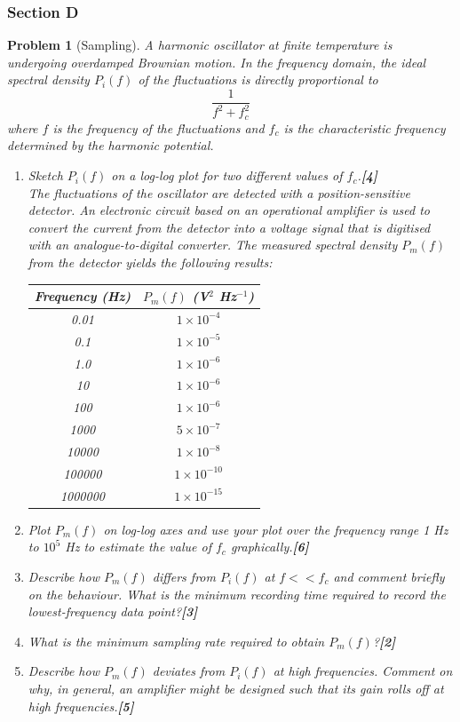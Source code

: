 \documentclass[a4paper]{article}
\theoremstyle{new}
\newtheorem{qns}{Problem}[subsection]
\begin{document}
\subsubsection{Section D}
\begin{qns}[Sampling]
A harmonic oscillator at finite temperature is undergoing overdamped Brownian motion. In the frequency domain, the ideal spectral density $P_i(f)$ of the fluctuations is directly proportional to
$$\frac{1}{f^2+f_c^2}$$
where $f$ is the frequency of the fluctuations and $f_c$ is the characteristic frequency determined by the harmonic potential.
\begin{enumerate}[label=(\roman*)]
\item Sketch $P_i(f)$ on a log-log plot for two different values of $f_c$.\hfill\textbf{[4]}\\[5pt]
The fluctuations of the oscillator are detected with a position-sensitive detector. An electronic circuit based on an operational amplifier is used to convert the current from the detector into a voltage signal that is digitised with an analogue-to-digital converter. The measured spectral density $P_m(f)$ from the detector yields the following results:
\begin{center}
\begin{tabular}{|c|c|}
\hline
Frequency (Hz) & $P_m(f)$ (V$^2$ Hz$^{-1}$)\\
\hline
0.01 & $1\times10^{-4}$\\
0.1 & $1\times10^{-5}$\\
1.0 & $1\times10^{-6}$\\
10 & $1\times10^{-6}$\\
100 & $1\times10^{-6}$\\
1000 & $5\times10^{-7}$\\
10000 & $1\times10^{-8}$\\
100000 & $1\times10^{-10}$\\
1000000 & $1\times10^{-15}$\\
\hline
\end{tabular}
\end{center}
\item Plot $P_m(f)$ on log-log axes and use your plot over the frequency range 1 Hz to $10^5$ Hz to estimate the value of $f_c$ graphically.\hfill\textbf{[6]}
\item Describe how $P_m(f)$ differs from $P_i(f)$ at $f<<f_c$ and comment briefly on the behaviour. What is the minimum recording time required to record the lowest-frequency data point?\hfill\textbf{[3]}
\item What is the minimum sampling rate required to obtain $P_m(f)$?\hfill\textbf{[2]}
\item Describe how $P_m(f)$ deviates from $P_i(f)$ at high frequencies. Comment on why, in general, an amplifier might be designed such that its gain rolls off at high frequencies.\hfill\textbf{[5]}
\end{enumerate}
\end{qns}
\end{document}
